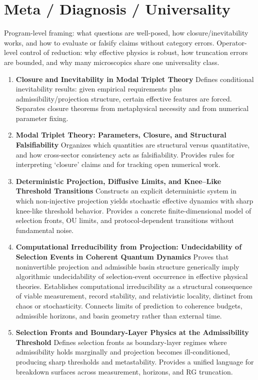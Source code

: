 \documentclass[11pt]{article}
\begin{document}
\section{Meta / Diagnosis / Universality}
Program-level framing: what questions are well-posed, how closure/inevitability works, and how to evaluate or falsify claims without category errors.
Operator-level control of reduction: why effective physics is robust, how truncation errors are bounded, and why many microscopics share one universality class.

\begin{enumerate}[leftmargin=*]

\item \textbf{Closure and Inevitability in Modal Triplet Theory} Defines conditional inevitability results: given empirical requirements plus admissibility/projection structure, certain effective features are forced. Separates closure theorems from metaphysical necessity and from numerical parameter fixing.

\item \textbf{Modal Triplet Theory: Parameters, Closure, and Structural Falsifiability} Organizes which quantities are structural versus quantitative, and how cross-sector consistency acts as falsifiability. Provides rules for interpreting ‘closure’ claims and for tracking open numerical work.


\item \textbf{Deterministic Projection, Diffusive Limits, and Knee--Like Threshold Transitions}
Constructs an explicit deterministic system in which non-injective projection yields stochastic effective dynamics with sharp knee-like threshold behavior. Provides a concrete finite-dimensional model of selection fronts, OU limits, and protocol-dependent transitions without fundamental noise.
\item \textbf{Computational Irreducibility from Projection: Undecidability of Selection Events in Coherent Quantum Dynamics} 
Proves that noninvertible projection and admissible basin structure generically imply algorithmic undecidability of selection-event occurrence in effective physical theories. Establishes computational irreducibility as a structural consequence of viable measurement, record stability, and relativistic locality, distinct from chaos or stochasticity. Connects limits of prediction to coherence budgets, admissible horizons, and basin geometry rather than external time.

\item \textbf{Selection Fronts and Boundary-Layer Physics at the Admissibility Threshold} Defines selection fronts as boundary-layer regimes where admissibility holds marginally and projection becomes ill-conditioned, producing sharp thresholds and metastability. Provides a unified language for breakdown surfaces across measurement, horizons, and RG truncation.


\end{enumerate}
\end{document}
